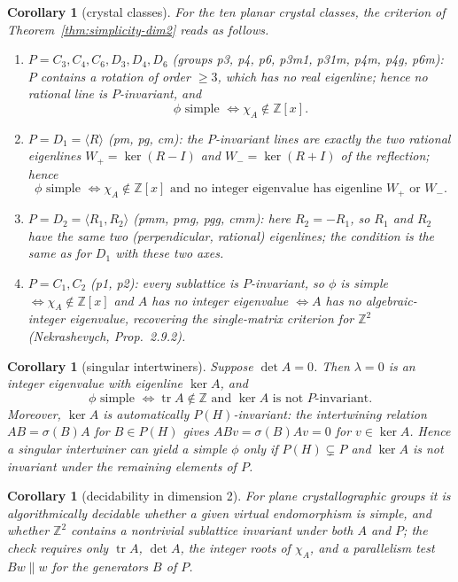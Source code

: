 \documentclass[12pt]{article}
\newtheorem{corollary}[theorem]{Corollary}
\theoremstyle{definition}
\begin{document}
\begin{corollary}[crystal classes]\label{cor:crystal-classes}
For the ten planar crystal classes, the criterion of
Theorem~\ref{thm:simplicity-dim2} reads as follows.
\begin{enumerate}
\item $P=C_3,C_4,C_6,D_3,D_4,D_6$ \emph{(groups p3, p4, p6, p3m1, p31m,
p4m, p4g, p6m)}: $P$ contains a rotation of order $\ge3$, which has no
real eigenline; hence no rational line is $P$-invariant, and
\[
\phi \text{ simple } \iff \chi_A\notin\mathbb{Z}[x].
\]
\item $P=D_1=\langle R\rangle$ \emph{(pm, pg, cm)}: the $P$-invariant
lines are exactly the two rational eigenlines
$W_+=\ker(R-I)$ and $W_-=\ker(R+I)$ of the reflection; hence
\[
\phi \text{ simple } \iff \chi_A\notin\mathbb{Z}[x]
\text{ and no integer eigenvalue has eigenline } W_+ \text{ or } W_-.
\]
\item $P=D_2=\langle R_1,R_2\rangle$ \emph{(pmm, pmg, pgg, cmm)}: here
$R_2=-R_1$, so $R_1$ and $R_2$ have the same two (perpendicular,
rational) eigenlines; the condition is the same as for $D_1$ with these
two axes.
\item $P=C_1,C_2$ \emph{(p1, p2)}: every sublattice is $P$-invariant, so
$\phi$ is simple $\iff \chi_A\notin\mathbb{Z}[x]$
 and  $A$  has no integer eigenvalue  $\iff A$ has no algebraic-integer eigenvalue,
recovering the single-matrix criterion for $\mathbb{Z}^2$
\emph{(}Nekrashevych, Prop.~2.9.2\emph{)}.
\end{enumerate}
\end{corollary}

\begin{corollary}[singular intertwiners]\label{cor:singular}
Suppose $\det A=0$. Then $\lambda=0$ is an integer eigenvalue with
eigenline $\ker A$, and
\[
\phi \text{ simple } \iff
\operatorname{tr}A\notin\mathbb{Z}
\text{ and } \ker A \text{ is not } P\text{-invariant.}
\]
Moreover, $\ker A$ is automatically $P(H)$-invariant: the intertwining
relation $AB=\sigma(B)A$ for $B\in P(H)$ gives $ABv=\sigma(B)Av=0$ for
$v\in\ker A$. Hence a singular intertwiner can yield a simple $\phi$
only if $P(H)\subsetneq P$ and $\ker A$ is not invariant under the
remaining elements of $P$.
\end{corollary}

\begin{corollary}[decidability in dimension 2]\label{cor:decidable}
For plane crystallographic groups it is algorithmically decidable
whether a given virtual endomorphism is simple, and whether
$\mathbb{Z}^2$ contains a nontrivial sublattice invariant under both
$A$ and $P$; the check requires only $\operatorname{tr}A$, $\det A$,
the integer roots of $\chi_A$, and a parallelism test $Bw\parallel w$
for the generators $B$ of $P$.
\end{corollary}
\end{document}
